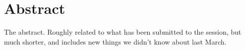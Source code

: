 
\section*{Abstract}

The abstract. Roughly related to what has been submitted to the session, but
much shorter, and includes new things we didn't know about last March.

